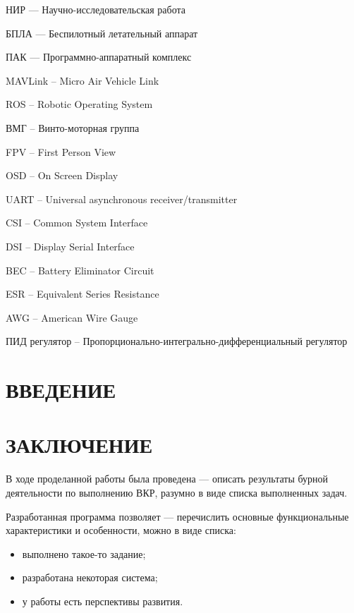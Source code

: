 \documentclass[a4paper,12pt]{article}
\begin{document}
НИР --- Научно-исследовательская работа

БПЛА --- Беспилотный летательный аппарат

ПАК --- Программно-аппаратный комплекс

MAVLink -- Micro Air Vehicle Link

ROS -- Robotic Operating System

ВМГ -- Винто-моторная группа

FPV -- First Person View

OSD -- On Screen Display

UART -- Universal asynchronous receiver/transmitter

CSI -- Common System Interface

DSI -- Display Serial Interface

BEC -- Battery Eliminator Circuit

ESR -- Equivalent Series Resistance

AWG -- American Wire Gauge

ПИД регулятор -- Пропорционально-интегрально-дифференциальный регулятор


\pagebreak
\thispagestyle{empty}

\tableofcontents
\thispagestyle{empty} %
\pagebreak

\section*{\centering ВВЕДЕНИЕ}
\setcounter{page}{3}
\pagebreak

%
\pagebreak
\pagebreak
\pagebreak
\pagebreak
\pagebreak
\pagebreak

\section*{\centering ЗАКЛЮЧЕНИЕ}

В ходе проделанной работы была проведена --- описать результаты бурной деятельности по выполнению ВКР, разумно в виде списка выполненных задач.

Разработанная программа позволяет --- перечислить основные функциональные характеристики и особенности, можно в виде списка:
\begin{itemize}
\item выполнено такое-то задание;
\item разработана некоторая система;
\item у работы есть перспективы развития.
\end{itemize}
\end{document}
